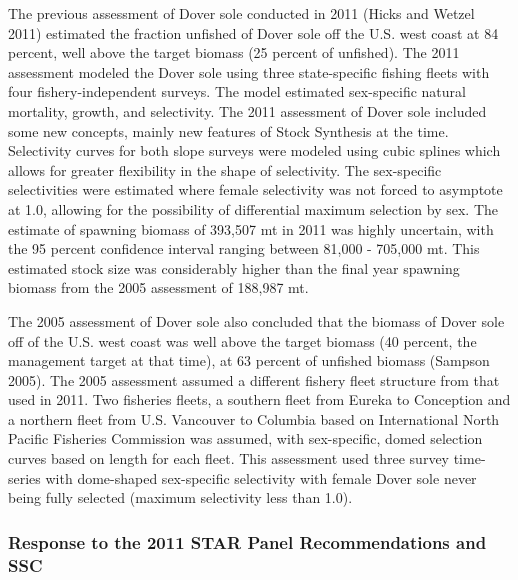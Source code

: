 \documentclass[11pt,
  english,
  a4paper,
]{article}
\begin{document}
The previous assessment of Dover sole conducted in 2011 {(Hicks and Wetzel 2011)\leavevmode\tagmcend\tagstructend} estimated the fraction unfished of Dover sole off the U.S. west coast at 84 percent, well above the target biomass (25 percent of unfished). The 2011 assessment modeled the Dover sole using three state-specific fishing fleets with four fishery-independent surveys. The model estimated sex-specific natural mortality, growth, and selectivity. The 2011 assessment of Dover sole included some new concepts, mainly new features of Stock Synthesis at the time. Selectivity curves for both slope surveys were modeled using cubic splines which allows for greater flexibility in the shape of selectivity. The sex-specific selectivities were estimated where female selectivity was not forced to asymptote at 1.0, allowing for the possibility of differential maximum selection by sex. The estimate of spawning biomass of 393,507 mt in 2011 was highly uncertain, with the 95 percent confidence interval ranging between 81,000 - 705,000 mt. This estimated stock size was considerably higher than the final year spawning biomass from the 2005 assessment of 188,987 mt.

\leavevmode\tagmcend\tagstructend\par


The 2005 assessment of Dover sole also concluded that the biomass of Dover sole off of the U.S. west coast was well above the target biomass (40 percent, the management target at that time), at 63 percent of unfished biomass {(Sampson 2005)\leavevmode\tagmcend\tagstructend}. The 2005 assessment assumed a different fishery fleet structure from that used in 2011. Two fisheries fleets, a southern fleet from Eureka to Conception and a northern fleet from U.S. Vancouver to Columbia based on International North Pacific Fisheries Commission was assumed, with sex-specific, domed selection curves based on length for each fleet. This assessment used three survey time-series with dome-shaped sex-specific selectivity with female Dover sole never being fully selected (maximum selectivity less than 1.0).

\leavevmode\tagmcend\tagstructend\par


\hypertarget{response-to-the-2011-star-panel-recommendations-and-ssc}{%
\subsubsection{Response to the 2011 STAR Panel Recommendations and SSC}\label{response-to-the-2011-star-panel-recommendations-and-ssc}}
\end{document}
